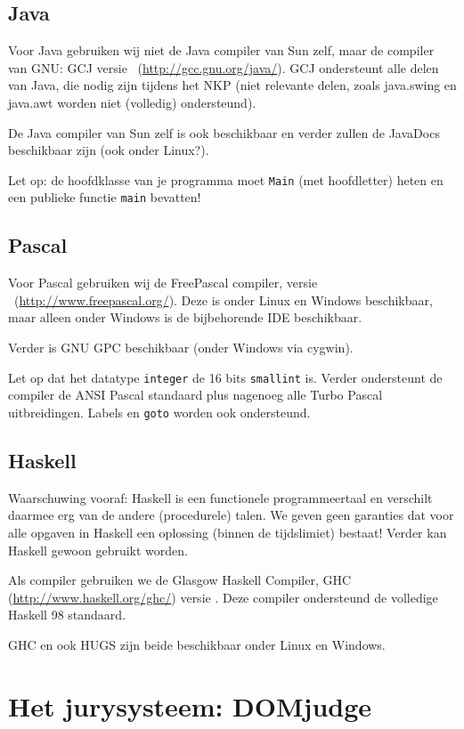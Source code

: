 \documentclass[11pt,titlepage,a4paper]{article}
\newcommand{\DOMjudge}{DOMjudge }
\begin{document}
\subsection{Java}

Voor Java gebruiken wij niet de Java compiler van Sun zelf, maar de
compiler van GNU: GCJ versie \LINUXGCJ\
(\url{http://gcc.gnu.org/java/}). GCJ ondersteunt
alle delen van Java, die nodig zijn tijdens het NKP (niet relevante
delen, zoals java.swing en java.awt worden niet (volledig)
ondersteund).

De Java compiler van Sun zelf is ook beschikbaar en verder zullen de
JavaDocs beschikbaar zijn (ook onder Linux?).

Let op: de hoofdklasse van je programma moet \texttt{Main} (met
hoofdletter) heten en een publieke functie \texttt{main} bevatten!

\subsection{Pascal}

Voor Pascal gebruiken wij de FreePascal compiler, versie
\LINUXFPC\ (\url{http://www.freepascal.org/}). Deze is onder
Linux en Windows beschikbaar, maar alleen onder Windows is de
bijbehorende IDE beschikbaar.

Verder is GNU GPC beschikbaar (onder Windows via cygwin).

Let op dat het datatype \texttt{integer} de 16 bits \texttt{smallint}
is. Verder ondersteunt de compiler de ANSI Pascal standaard plus
nagenoeg alle Turbo Pascal uitbreidingen. Labels en \texttt{goto}
worden ook ondersteund.

\subsection{Haskell}

Waarschuwing vooraf: Haskell is een functionele programmeertaal en
verschilt daarmee erg van de andere (procedurele) talen. We geven geen
garanties dat voor alle opgaven in Haskell een oplossing (binnen de
tijdslimiet) bestaat! Verder kan Haskell gewoon gebruikt worden.

Als compiler gebruiken we de Glasgow Haskell Compiler, GHC
(\url{http://www.haskell.org/ghc/}) versie \LINUXGHC. Deze compiler
ondersteund de volledige Haskell 98 standaard.

GHC en ook HUGS zijn beide beschikbaar onder Linux en Windows.


\newpage
\section{Het jurysysteem: \DOMjudge}
\end{document}
